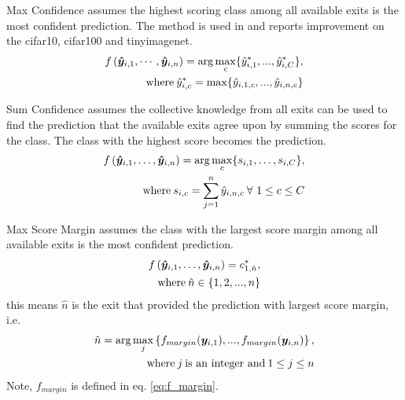 \begin{enumdescript}
\begin{enumdescript}
		\item[Max Confidence] assumes the highest scoring class among all available exits is the most confident prediction. The method is used in \cite{kaya_shallow-deep_nodate} and reports improvement on the \gls{cifar10}, \gls{cifar100} and \gls{tinyimagenet}. 
		\begin{align}
		\begin{split}
		f\left(\bm{\hat{y}}_{i,1}, \cdots, \bm{\hat{y}}_{i,n} \right) =  \arg \underset{c}{\max} \{\hat{y}^*_{i,1}, ..., \hat{y}^*_{i,C} \},
		\\ \text{where\:} \hat{y}^*_{i,c} = \max \{\hat{y}_{i,1,c}, ..., \hat{y}_{i,n,c}\}
		\end{split}	
		\end{align}
		\item[Sum Confidence] assumes the collective knowledge from all exits can be used to find the prediction that the available exits agree upon by summing the scores for the class. The class with the highest score becomes the prediction.
		\begin{align}
		\begin{split}
		f\left(\bm{\hat{y}}_{i,1}, \dots, \bm{\hat{y}}_{i,n} \right) = \arg \underset{c}{\max} \{s_{i,1}, \dots, s_{i,C}\}, \\ \text{where\:} s_{i,c} = \sum_{j=1}^{n}\hat{y}_{i,n,c}\: \forall \ 1\le c \le C
		\end{split}
		\end{align}			
		\item[Max Score Margin] assumes the class with the largest score margin among all available exits is the most confident prediction. 			\begin{align}
		\begin{split}
		f\left(\bm{\hat{y}}_{i,1}, \dots, \bm{\hat{y}}_{i,n} \right) =c^*_{1,\hat{n}},\\
		\text{where\:} \hat{n} \in \{1, 2, ..., n\}
		\end{split}	
		\end{align}
		this means $ \hat{n} $ is the exit that provided the prediction with largest score margin, i.e.
		\begin{align*}
		\begin{split}
		\hat{n} = \arg \underset{j}{\max} \left\{f_{margin}(\bm{y}_{i,1}), ..., f_{margin}(\bm{y}_{i,n})\right\} ,\\
		\text{where\:} j \text{\:is an integer and\:} 1 \le j \le n
		\end{split}
		\end{align*}
		Note, $ f_{margin} $ is defined in eq. \ref{eq:f_margin}.
	\end{enumdescript}
	

\end{enumdescript}
